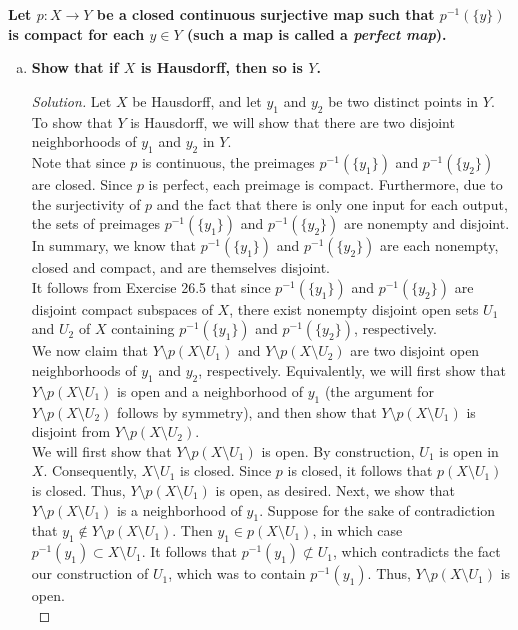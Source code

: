 \documentclass[11pt]{article}
\newenvironment{solution}
  {\renewcommand\qedsymbol{$\blacksquare$}\begin{proof}[Solution]}
  {\end{proof}}
\begin{document}
\textbf{Let $p\colon X \rightarrow Y$ be a closed continuous surjective map such that $p^{-1}(\{ y \})$ is compact for each $y \in Y$ (such a map is called a \textit{perfect map}).}
\begin{enumerate}[a)]
    \item \textbf{Show that if $X$ is Hausdorff, then so is $Y$.}
    
    \begin{solution}
        Let $X$ be Hausdorff, and let $y_1$ and $y_2$ be two distinct points in $Y$. To show that $Y$ is Hausdorff, we will show that there are two disjoint neighborhoods of $y_1$ and $y_2$ in $Y$. \\
        
        Note that since $p$ is continuous, the preimages $p^{-1}(\{ y_1 \} )$ and $p^{-1}(\{ y_2 \} )$ are closed. Since $p$ is perfect, each preimage is compact. 
        Furthermore, due to the surjectivity of $p$ and the fact that there is only one input for each output, the sets of preimages $p^{-1}(\{ y_1 \} )$ and $p^{-1}(\{ y_2 \} )$ are nonempty and disjoint. 
        In summary, we know that  $p^{-1}(\{ y_1 \} )$ and $p^{-1}(\{ y_2 \} )$ are each nonempty, closed and compact, and are themselves disjoint. \\

        It follows from Exercise 26.5 that since  $p^{-1}(\{ y_1 \} )$ and $p^{-1}(\{ y_2 \} )$ are disjoint compact subspaces of $X$, there exist nonempty disjoint open sets $U_1$ and $U_2$ of $X$ containing  $p^{-1}(\{ y_1 \} )$ and $p^{-1}(\{ y_2 \} )$, respectively. \\

        We now claim that $Y \setminus p(X \setminus U_1)$ and $Y \setminus p(X \setminus U_2)$ are two disjoint open neighborhoods of $y_1$ and $y_2$, respectively. Equivalently, we will first show that $Y \setminus p(X \setminus U_1)$ is open and a neighborhood of $y_1$ (the argument
        for $Y \setminus p(X \setminus U_2)$ follows by symmetry), and then show that $Y \setminus p(X \setminus U_1)$ is disjoint from $Y \setminus p(X \setminus U_2)$. \\

        We will first show that $Y \setminus p(X \setminus U_1)$ is open. By construction, $U_1$ is open in $X$. Consequently, $X \setminus U_1$ is closed. Since $p$ is closed, it follows that $p(X \setminus U_1)$ is closed. Thus, $Y \setminus p(X \setminus U_1)$ is open, as desired. Next, we show
        that $Y \setminus p(X \setminus U_1)$ is a neighborhood of $y_1$. Suppose for the sake of contradiction that $y_1 \notin Y \setminus p(X \setminus U_1)$. Then $y_1 \in p(X \setminus U_1)$, in which case $p^{-1}(y_1) \subset X \setminus U_1$. It follows that
        $p^{-1}(y_1) \not\subset U_1$, which contradicts the fact our construction of $U_1$, which was to contain $p^{-1}(y_1)$. Thus, $Y \setminus p(X \setminus U_1)$ is open. \\
        

\end{solution}
\end{enumerate}
\end{document}
